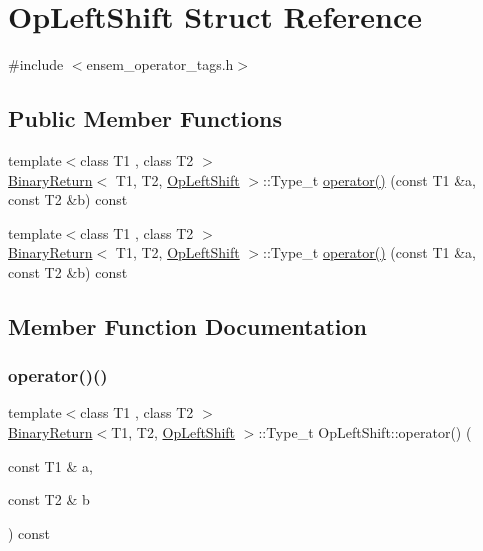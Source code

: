 \hypertarget{structOpLeftShift}{}\section{Op\+Left\+Shift Struct Reference}
\label{structOpLeftShift}


{\ttfamily \#include $<$ensem\+\_\+operator\+\_\+tags.\+h$>$}

\subsection*{Public Member Functions}
\begin{DoxyCompactItemize}
\item 
{\footnotesize template$<$class T1 , class T2 $>$ }\\\mbox{\hyperlink{structBinaryReturn}{Binary\+Return}}$<$ T1, T2, \mbox{\hyperlink{structOpLeftShift}{Op\+Left\+Shift}} $>$\+::Type\+\_\+t \mbox{\hyperlink{structOpLeftShift_a1f91da026aec3d0ff36e700c21152b3c}{operator()}} (const T1 \&a, const T2 \&b) const
\item 
{\footnotesize template$<$class T1 , class T2 $>$ }\\\mbox{\hyperlink{structBinaryReturn}{Binary\+Return}}$<$ T1, T2, \mbox{\hyperlink{structOpLeftShift}{Op\+Left\+Shift}} $>$\+::Type\+\_\+t \mbox{\hyperlink{structOpLeftShift_a1f91da026aec3d0ff36e700c21152b3c}{operator()}} (const T1 \&a, const T2 \&b) const
\end{DoxyCompactItemize}


\subsection{Member Function Documentation}
\mbox{\label{structOpLeftShift_a1f91da026aec3d0ff36e700c21152b3c}} 
\subsubsection{\texorpdfstring{operator()()}{operator()()}\hspace{0.1cm}{\footnotesize\ttfamily [1/2]}}
{\footnotesize\ttfamily template$<$class T1 , class T2 $>$ \\
\mbox{\hyperlink{structBinaryReturn}{Binary\+Return}}$<$T1, T2, \mbox{\hyperlink{structOpLeftShift}{Op\+Left\+Shift}} $>$\+::Type\+\_\+t Op\+Left\+Shift\+::operator() (\begin{DoxyParamCaption}\item[{const T1 \&}]{a,  }\item[{const T2 \&}]{b }\end{DoxyParamCaption}) const\hspace{0.3cm}{\ttfamily [inline]}}

